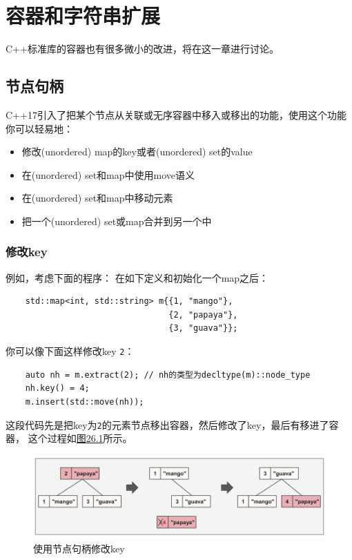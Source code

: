 \chapter{容器和字符串扩展}\label{ch26}
C++标准库的容器也有很多微小的改进，将在这一章进行讨论。


\section{节点句柄}
C++17引入了把某个节点从关联或无序容器中移入或移出的功能，使用这个功能你可以轻易地：
\begin{itemize}
    \item 修改(unordered) map的key或者(unordered) set的value
    \item 在(unordered) set和map中使用move语义
    \item 在(unordered) set和map中移动元素
    \item 把一个(unordered) set或map合并到另一个中
\end{itemize}

\subsection{修改key}
例如，考虑下面的程序：
在如下定义和初始化一个map之后：
\begin{lstlisting}
    std::map<int, std::string> m{{1, "mango"},
                                 {2, "papaya"},
                                 {3, "guava"}};
\end{lstlisting}
你可以像下面这样修改key \texttt{2}：
\begin{lstlisting}
    auto nh = m.extract(2); // nh的类型为decltype(m)::node_type
    nh.key() = 4;
    m.insert(std::move(nh));
\end{lstlisting}
这段代码先是把key为\texttt{2}的元素节点移出容器，然后修改了key，最后有移进了容器，
这个过程如\hyperref[f26.1]{图26.1}所示。
\begin{figure}[htb]
    \centering
    \includegraphics[scale=0.67]{../imgs/26.1.png}
    \caption{使用节点句柄修改key}
    \label{f26.1}
\end{figure}


